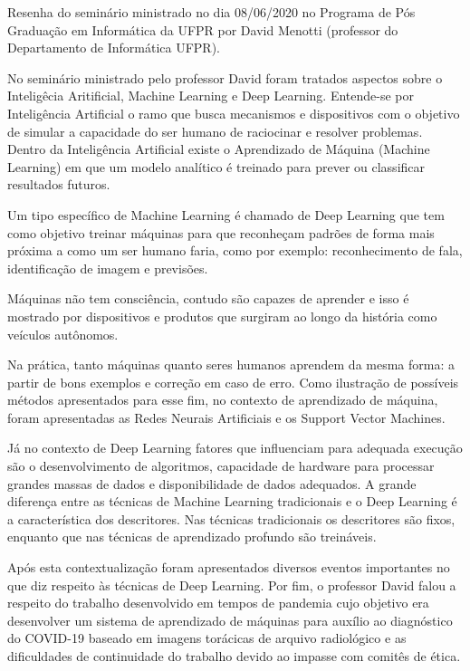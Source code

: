 
Resenha do seminário ministrado no dia 08/06/2020 no Programa de Pós Graduação em Informática da UFPR por David Menotti (professor do Departamento de Informática UFPR).

No seminário ministrado pelo professor David foram tratados aspectos sobre o Inteligêcia Aritificial, Machine Learning e Deep Learning. Entende-se por Inteligência Artificial o ramo que busca mecanismos e dispositivos com o objetivo de simular a capacidade do ser humano de raciocinar e resolver problemas. Dentro da Inteligência Artificial existe o Aprendizado de Máquina (Machine Learning) em que um modelo analítico é treinado para prever ou classificar resultados futuros.

Um tipo específico de Machine Learning é chamado de Deep Learning que tem como objetivo treinar máquinas para que reconheçam padrões de forma mais próxima a como um ser humano faria, como por exemplo: reconhecimento de fala, identificação de imagem e previsões.

Máquinas não tem consciência, contudo são capazes de aprender e isso é mostrado por dispositivos e produtos que surgiram ao longo da história como veículos autônomos. 

Na prática, tanto máquinas quanto seres humanos aprendem da mesma forma: a partir de bons exemplos e correção em caso de erro. Como ilustração de possíveis métodos apresentados para esse fim, no contexto de aprendizado de máquina, foram apresentadas as Redes Neurais Artificiais e os Support Vector Machines. 

Já no contexto de Deep Learning fatores que influenciam para adequada execução são o desenvolvimento de algoritmos, capacidade de hardware para processar grandes massas de dados e disponibilidade de dados adequados. A grande diferença entre as técnicas de Machine Learning tradicionais e o Deep Learning é a característica dos descritores. Nas técnicas tradicionais os descritores são fixos, enquanto que nas técnicas de aprendizado profundo são treináveis.

Após esta contextualização foram apresentados diversos eventos importantes no que diz respeito às técnicas de Deep Learning. Por fim, o professor David falou a respeito do trabalho desenvolvido em tempos de pandemia cujo objetivo era desenvolver um sistema de aprendizado de máquinas para auxílio ao diagnóstico do COVID-19 baseado em imagens torácicas de arquivo radiológico e as dificuldades de continuidade do trabalho devido ao impasse com comitês de ética.




